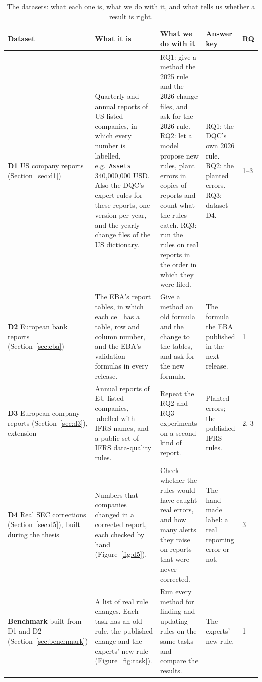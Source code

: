 \documentclass[11pt,a4paper]{article}
\renewcommand{\arraystretch}{1.2}
\begin{document}
\begin{table}[htb]
\centering
\footnotesize
\renewcommand{\arraystretch}{1.15}
\begin{tabularx}{\textwidth}{P{2.0cm} L L P{3.0cm} P{0.85cm}}
\toprule
Dataset & What it is & What we do with it & Answer key & RQ \\
\midrule
\textbf{D1} US company reports (Section~\ref{sec:d1}) & Quarterly and annual reports of US listed companies, in which every number is labelled, e.g.\ \texttt{Assets} = 340,000,000 USD. Also the DQC's expert rules for these reports, one version per year, and the yearly change files of the US dictionary. & RQ1: give a method the 2025 rule and the 2026 change files, and ask for the 2026 rule. RQ2: let a model propose new rules, plant errors in copies of reports and count what the rules catch. RQ3: run the rules on real reports in the order in which they were filed. & RQ1: the DQC's own 2026 rule. RQ2: the planted errors. RQ3: dataset D4. & 1--3 \\ \addlinespace
\textbf{D2} European bank reports (Section~\ref{sec:eba}) & The EBA's report tables, in which each cell has a table, row and column number, and the EBA's validation formulas in every release. & Give a method an old formula and the change to the tables, and ask for the new formula. & The formula the EBA published in the next release. & 1 \\ \addlinespace
\textbf{D3} European company reports (Section~\ref{sec:d3}), extension & Annual reports of EU listed companies, labelled with IFRS names, and a public set of IFRS data-quality rules. & Repeat the RQ2 and RQ3 experiments on a second kind of report. & Planted errors; the published IFRS rules. & 2, 3 \\ \addlinespace
\textbf{D4} Real SEC corrections (Section~\ref{sec:d5}), built during the thesis & Numbers that companies changed in a corrected report, each checked by hand (Figure~\ref{fig:d5}). & Check whether the rules would have caught real errors, and how many alerts they raise on reports that were never corrected. & The hand-made label: a real reporting error or not. & 3 \\ \addlinespace
\textbf{Benchmark} built from D1 and D2 (Section~\ref{sec:benchmark}) & A list of real rule changes. Each task has an old rule, the published change and the experts' new rule (Figure~\ref{fig:task}). & Run every method for finding and updating rules on the same tasks and compare the results. & The experts' new rule. & 1 \\
\bottomrule
\end{tabularx}
\caption{The datasets: what each one is, what we do with it, and what tells us whether a result is right.}
\label{tab:datasets}
\end{table}
\end{document}
